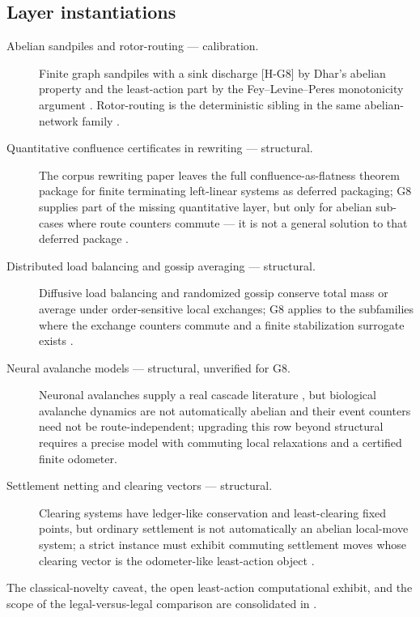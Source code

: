 \documentclass[11pt]{article}
\theoremstyle{definition}
\begin{document}
\subsection*{Layer instantiations}\label{layer-inst:G8}
\begin{description}
  \item[Abelian sandpiles and rotor-routing --- calibration.] Finite graph sandpiles with a sink
    discharge \textup{[H-G8]} by Dhar's abelian property and the least-action part by the
    Fey--Levine--Peres monotonicity argument \citep{Dhar1990,FeyLevinePeres2010}. Rotor-routing is the
    deterministic sibling in the same abelian-network family \citep{HolroydEtAl2008}.
  \item[Quantitative confluence certificates in rewriting --- structural.] The corpus rewriting paper
    leaves the full confluence-as-flatness theorem package for finite terminating left-linear systems
    as deferred packaging; G8 supplies part of the missing quantitative layer, but only for abelian
    sub-cases where route counters commute --- it is not a general solution to that deferred package
    \citep{Tsiokos2026Rewriting}.
  \item[Distributed load balancing and gossip averaging --- structural.] Diffusive load balancing and
    randomized gossip conserve total mass or average under order-sensitive local exchanges; G8 applies
    to the subfamilies where the exchange counters commute and a finite stabilization surrogate exists
    \citep{Cybenko1989,BoydEtAl2006}.
  \item[Neural avalanche models --- structural, unverified for G8.] Neuronal avalanches supply a real
    cascade literature \citep{BeggsPlenz2003}, but biological avalanche dynamics are not automatically
    abelian and their event counters need not be route-independent; upgrading this row beyond
    structural requires a precise model with commuting local relaxations and a certified finite
    odometer.
  \item[Settlement netting and clearing vectors --- structural.] Clearing systems have ledger-like
    conservation and least-clearing fixed points, but ordinary settlement is not automatically an
    abelian local-move system; a strict instance must exhibit commuting settlement moves whose clearing
    vector is the odometer-like least-action object \citep{EisenbergNoe2001}.
\end{description}

The classical-novelty caveat, the open least-action computational exhibit, and the scope of the
legal-versus-legal comparison are consolidated in .
\end{document}

